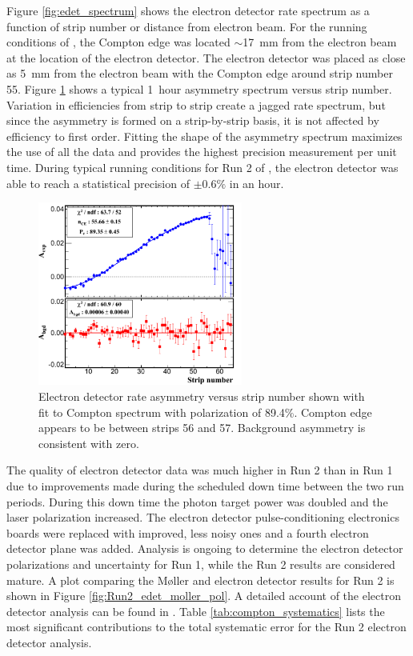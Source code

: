 Figure \ref{fig:edet_spectrum} shows the electron detector rate spectrum as a function of strip number or distance from electron beam. For the running conditions of \Q, the Compton edge was located $\sim$17~mm from the electron beam at the location of the electron detector. The electron detector was placed as close as 5~mm from the electron beam with the Compton edge around strip number 55.  Figure \ref{fig:edet_asym} shows a typical 1~hour asymmetry spectrum versus strip number. Variation in efficiencies from strip to strip create a jagged rate spectrum, but since the asymmetry is formed on a strip-by-strip basis, it is not affected  by efficiency to first order. Fitting the shape of the asymmetry spectrum maximizes the use of all the data and provides the highest precision measurement per unit time. During typical running conditions for Run 2 of \Q, the electron detector was able to reach a statistical precision of $\pm0.6\%$ in an hour.
\begin{figure}[ht]
\centering
\includegraphics[width=0.6\textwidth]{Pictures/edet_asym.png}
\caption{Electron detector rate asymmetry versus strip number shown with fit to Compton spectrum with polarization of 89.4\%. Compton edge appears to be between strips 56 and 57. Background asymmetry is consistent with zero.}
\label{fig:edet_asym}
\end{figure} 

The quality of electron detector data was much higher in Run 2 than in Run 1 due to improvements made during the scheduled down time between the two run periods. During this down time the photon target power was doubled and the laser polarization increased. The electron detector pulse-conditioning electronics boards were replaced with improved, less noisy ones and a fourth electron detector plane was added. Analysis is ongoing to determine the electron detector polarizations and uncertainty for Run 1, while the Run 2 results are considered mature. A plot comparing the M\o ller and electron detector results for Run 2 is shown in Figure \ref{fig:Run2_edet_moller_pol}. A detailed account of the electron detector analysis can be found in \cite{Narayan}. Table \ref{tab:compton_systematics} lists the most significant contributions to the total systematic error for the Run 2 electron detector analysis.


